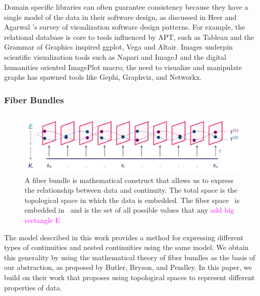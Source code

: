 \documentclass[10pt,journal,compsoc]{IEEEtran}
\newcommand{\note}[1]{\textcolor{magenta}{#1}}
\theoremstyle{definition}
\theoremstyle{remark}
\begin{document}
Domain specific libraries can often guarantee consistency because they have a single model of the data in their software design, as discussed in Heer and Agarwal \cite{HeerSoftware2006}'s survey of visualization software design patterns. For example, the relational database is core to tools influenced by APT, such as Tableau\cite{StoltePolaris2002,hanrahanVizQL2006,MackinlayShowme2007} and the Grammar of Graphics\cite{wilkinsonGrammarGraphics2005} inspired ggplot\cite{wickhamGgplot2ElegantGraphics2016a}, Vega\cite{satyanarayanDeclarativeInteractionDesign2014} and Altair\cite{vanderplasAltairInteractiveStatistical2018}. Images underpin scientific visualization tools such as Napari\cite{nicholas_sofroniew_2021_4533308} and ImageJ\cite{schneiderNIHImageImageJ2012} and the digital humanities oriented ImagePlot\cite{studiesCulturevisImageplot2021} macro; the need to visualize and manipulate graphs has spawned tools like Gephi\cite{bastianGephiOpenSource2009}, Graphviz\cite{ellsonGraphvizOpenSource2002}, and Networkx\cite{HagbergExploringNetwork2008}. 

 
\subsubsection{Fiber Bundles}
\label{sec:related-work:fiber-bundles}
\begin{figure}[h!]
  \includegraphics[width=\columnwidth]{fiberbundle.png}
  \caption{A fiber bundle is mathematical construct that allows us to express the relationship between data and continuity. The \textcolor{total}{total} space \dtotal is the topological space in which the data is embedded. The \textcolor{fiber}{fiber} space \dfiber\ is embedded in \dtotal\ and is the set of all possible values that any
  \note{add big rectangle E}}
  \label{fig:related-work:fiber-bundle}
\end{figure}

The model described in this work provides a method for expressing different types of continuities and nested continuities using the same model. We obtain this generality by using the mathematical theory of fiber bundles as the basis of our abstraction, as proposed by Butler, Bryson, and Pendley\cite{butlerVisualizationModelBased1989,butlerVectorBundleClassesForm1992}. In this paper, we build on their work that proposes using topological spaces to represent different properties of data.
\end{document}
